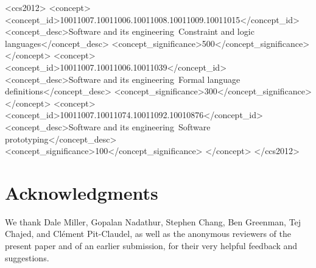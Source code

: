 \documentclass[review,acmsmall]{acmart}\settopmatter{}
\begin{document}
 \begin{CCSXML}
<ccs2012>
<concept>
<concept_id>10011007.10011006.10011008.10011009.10011015</concept_id>
<concept_desc>Software and its engineering~Constraint and logic languages</concept_desc>
<concept_significance>500</concept_significance>
</concept>
<concept>
<concept_id>10011007.10011006.10011039</concept_id>
<concept_desc>Software and its engineering~Formal language definitions</concept_desc>
<concept_significance>300</concept_significance>
</concept>
<concept>
<concept_id>10011007.10011074.10011092.10010876</concept_id>
<concept_desc>Software and its engineering~Software prototyping</concept_desc>
<concept_significance>100</concept_significance>
</concept>
</ccs2012>
\end{CCSXML}



\maketitle

{
  \setlength{\parskip}{3pt}
  \renewcommand{\labelitemi}{\textendash}

  \identDialog{}


  

  
  
  
  
  
  
  
  
  

  

  
  
  
  
  

  

  

  \identNormal{}

  \section*{Acknowledgments}
  We thank Dale Miller, Gopalan Nadathur, Stephen Chang, Ben Greenman, Tej Chajed, and Cl{\'e}ment Pit-Claudel, as well as the anonymous reviewers of the present paper and of an earlier submission, for their
  very helpful feedback and suggestions.
}


\end{document}
